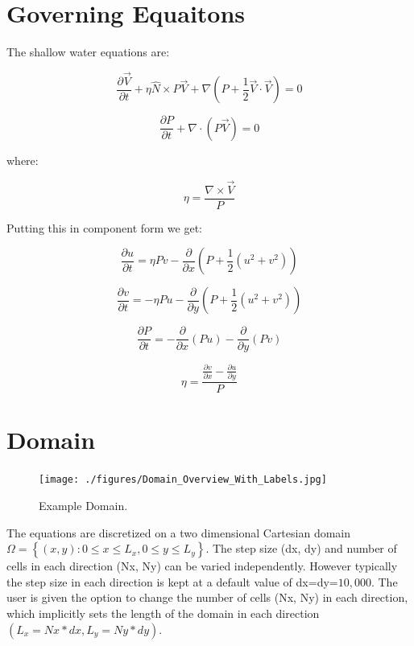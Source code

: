 \documentclass{article}
\begin{document}

\newcommand{\nodecolor}[1]{\textcolor{node_color}{#1}}
\newcommand{\cellcolor}[1]{\textcolor{cell_centered_color}{#1}}
\newcommand{\xfacecolor}[1]{\textcolor{x_face_color}{#1}}
\newcommand{\yfacecolor}[1]{\textcolor{y_face_color}{#1}}


\section{Governing Equaitons}
The shallow water equations are:

$$ \frac{\partial{\vec{V}}}{\partial t} + \eta \hat{N} \times P \vec{V} + \nabla \left( P + \frac{1}{2}\vec{V} \cdot \vec{V} \right) = 0$$

$$ \frac{\partial{P}}{\partial t} + \nabla \cdot \left( P \vec{V} \right) = 0$$

where:

$$ \eta = \frac{\nabla \times \vec{V}}{P} $$

Putting this in component form we get:


$$ { \frac{\partial u}{\partial t} }= \eta P v - \frac{\partial}{\partial x} \left( P + \frac{1}{2} (u^2 + v^2) \right)$$



$$  { \frac{\partial v}{\partial t} } = -\eta P u - \frac{\partial}{\partial y} \left( P + \frac{1}{2} (u^2 + v^2) \right)$$


$$  \frac{\partial P}{\partial t} = -\frac{\partial}{\partial x}\left(Pu\right) - \frac{\partial}{\partial y} (Pv) $$

$$ \eta = \frac{ \frac{\partial v}{\partial x} - \frac{\partial u}{\partial y} }{P} $$


\section{Domain}


\begin{figure}[h!]
	\texttt{[image: ./figures/Domain\_Overview\_With\_Labels.jpg]}
	\caption{Example Domain.}
	\label{fig: Domain}
\end{figure}

The equations are discretized on a two dimensional Cartesian domain $\Omega = \left\{ (x,y) : 0 \leq x \leq L_x,  0 \leq y \leq L_y \right\} $. The step size (dx, dy) and number of cells in each direction (Nx, Ny) can be varied independently. However typically the step size in each direction is kept at a default value of dx=dy=$10,000$. The user is given the option to change the number of cells (Nx, Ny) in each direction, which implicitly sets the length of the domain in each direction $(L_x = Nx * dx, L_y = Ny * dy)$.
\end{document}
